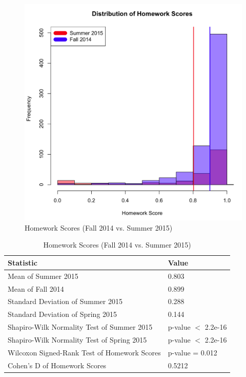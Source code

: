\begin{figure}
	\centering
	\includegraphics[width=5in]{img/chapter4/hw_su15_vs_f14}
	\caption[Homework Scores (Fall 2014 vs. Summer 2015)]{Homework Scores (Fall 2014 vs. Summer 2015)}
  \label{fig:hwSu14Su15}
\end{figure}

\begin{small}
\begin{table}
  \centering
  \begin{tabular}{|l|l|}
    \hline
    \textbf{Statistic} & \textbf{Value} \\
	\hline
	Mean of Summer 2015 & 0.803 \\
	\hline
	Mean of Fall 2014 & 0.899 \\
	\hline
	Standard Deviation of Summer 2015 & 0.288 \\
	\hline
	Standard Deviation of Spring 2015 & 0.144 \\
	\hline
	Shapiro-Wilk Normality Test of Summer 2015 & p-value $<$ 2.2e-16 \\
	\hline
	Shapiro-Wilk Normality Test of Spring 2015 & p-value $<$ 2.2e-16 \\
	\hline
	Wilcoxon Signed-Rank Test of Homework Scores & p-value = 0.012 \\
	\hline
	Cohen's D of Homework Scores & 0.5212 \\
	\hline
  \end{tabular}
	\caption[Homework Scores (Fall 2014 vs. Summer 2015)]{Homework Scores (Fall 2014 vs. Summer 2015)}
  \label{fig:hwSu14Su15}
\end{table}
\end{small}

